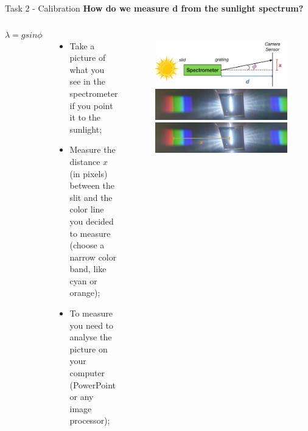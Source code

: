 \documentclass[9pt, xcolor=dvipsnames]{beamer}
\begin{document}
\begin{frame}{Task 2 - Calibration}	
\centering
	\textbf{How do we measure d from the sunlight spectrum?}
	\begin{columns}
\begin{equation*}
		 \lambda = g sin \phi
	\end{equation*}
	\begin{itemize}
		\item Take a picture of what you see in the spectrometer if you point it to the sunlight;
		\item Measure the distance $x$ (in pixels) between the slit and the color line you decided to measure (choose a narrow color band, like cyan or orange);
		\item  To measure you need to analyse the picture on your computer (PowerPoint or any image processor);

			\end{itemize}
		
		\begin{figure}
		\begin{centering}
			\centering
			\includegraphics[width=1 \textwidth]{Figures/scheme.png}
			\quad
			\includegraphics[width=1 \textwidth]{Figures/sunlight.png}
			\quad
			\includegraphics[width=1 \textwidth]{Figures/x.png}
			


\end{centering}
\end{figure}
\end{columns}
\end{frame}
\end{document}
